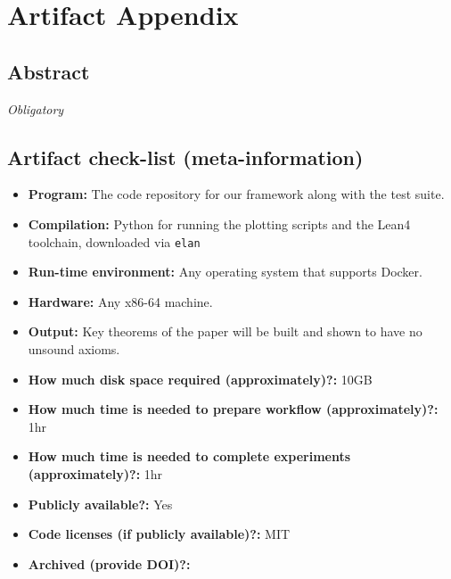 \documentclass{sigplanconf}
\begin{document}


\appendix
\section{Artifact Appendix}

\subsection{Abstract}

{\em Obligatory}

\subsection{Artifact check-list (meta-information)}


{\small
\begin{itemize}
  \item {\bf Program: } The code repository for our framework along with the test suite.
  \item {\bf Compilation: } Python for running the plotting scripts and the Lean4 toolchain, downloaded via \texttt{elan}
  \item {\bf Run-time environment: } Any operating system that supports Docker.
  \item {\bf Hardware: } Any x86-64 machine.
  \item {\bf Output: } Key theorems of the paper will be built and shown to have no unsound axioms.
  \item {\bf How much disk space required (approximately)?: } 10GB
  \item {\bf How much time is needed to prepare workflow (approximately)?: } 1hr
  \item {\bf How much time is needed to complete experiments (approximately)?: } 1hr
  \item {\bf Publicly available?: } Yes
  \item {\bf Code licenses (if publicly available)?: } MIT
  \item {\bf Archived (provide DOI)?: } \ourdoi{}
\end{itemize}
}
\end{document}
